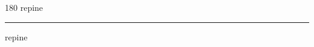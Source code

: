 
\begin{frame}
\begin{center}
\begin{turn}{180}
{\fontsize{2.5cm}{1em}\selectfont repine}
\end{turn}
\vspace{1em}\par  
\hrule
\vspace{1em}\par  
{\fontsize{2.5cm}{1em}\selectfont repine}
\end{center}
\end{frame}
